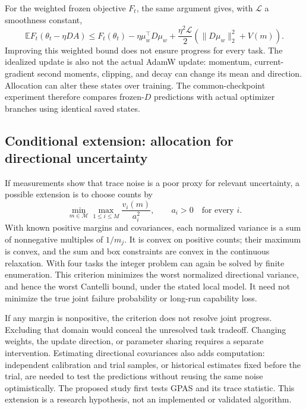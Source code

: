 For the weighted frozen objective $F_t$, the same argument gives, with
$\mathcal L$ a smoothness constant,
\begin{equation}
    \mathbb E F_t(\theta_t-\eta DA)
       \leq F_t(\theta_t)-\eta\mu_w^\top D\mu_w
       +\frac{\eta^2\mathcal L}{2}
         \left(\|D\mu_w\|_2^2+V(m)\right).
\end{equation}
Improving this weighted bound does not ensure progress for every task.
The idealized update is also not the actual AdamW update: momentum,
current-gradient second moments, clipping, and decay can change its
mean and direction. Allocation can alter these states over training.
The common-checkpoint experiment therefore compares frozen-$D$
predictions with actual optimizer branches using identical saved states.

\subsection{Conditional extension: allocation for directional uncertainty}
\label{app:directional_extension}

If measurements show that trace noise is a poor proxy for relevant
uncertainty, a possible extension is to choose counts by
\begin{equation}
    \min_{m\in\mathcal M}\max_{1\leq i\leq M}
           \frac{v_i(m)}{a_i^2},\qquad a_i>0\quad\text{for every }i.
    \label{eq:directional_extension}
\end{equation}
With known positive margins and covariances, each normalized variance
is a sum of nonnegative multiples of $1/m_j$. It is convex on positive
counts; their maximum is convex, and the sum and box constraints are
convex in the continuous relaxation. With four tasks the integer
problem can again be solved by finite enumeration. This criterion
minimizes the worst normalized directional variance, and hence the
worst Cantelli bound, under the stated local model. It need not minimize
the true joint failure probability or long-run capability loss.

If any margin is nonpositive, the criterion does not resolve joint
progress. Excluding that domain would conceal the unresolved task
tradeoff. Changing weights, the update direction, or parameter sharing
requires a separate intervention. Estimating directional covariances
also adds computation: independent calibration and trial samples, or
historical estimates fixed before the trial, are needed to test the
predictions without reusing the same noise optimistically. The proposed
study first tests GPAS and its trace statistic. This extension is a
research hypothesis, not an implemented or validated algorithm.

